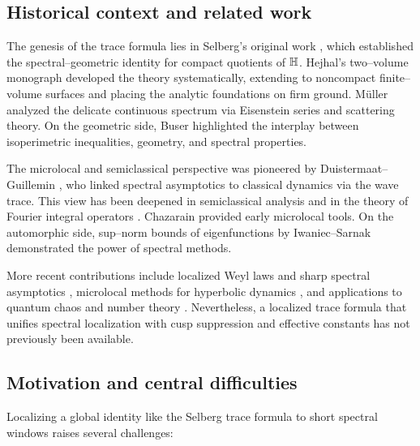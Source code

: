 \subsection{Historical context and related work}\label{subsec:history}

The genesis of the trace formula lies in Selberg’s original work
\cite{selberg1956}, which established the spectral–geometric identity for compact
quotients of $\mathbb{H}$. Hejhal’s two–volume monograph \cite{hejhal1976,hejhal1983} developed
the theory systematically, extending to noncompact finite–volume surfaces and placing the
analytic foundations on firm ground. M\"uller \cite{mueller1983} analyzed the delicate
continuous spectrum via Eisenstein series and scattering theory. On the geometric side,
Buser \cite{buser1992} highlighted the interplay between isoperimetric inequalities,
geometry, and spectral properties.

The microlocal and semiclassical perspective was pioneered by Duistermaat–Guillemin
\cite{duistermaatguillemin1975}, who linked spectral asymptotics to classical dynamics via
the wave trace. This view has been deepened in semiclassical analysis
\cite{zworski2012,dyatlov2019} and in the theory of Fourier integral operators
\cite{hormander1994III}. Chazarain \cite{chazarain1974} provided early microlocal tools.
On the automorphic side, sup–norm bounds of eigenfunctions by Iwaniec–Sarnak
\cite{iwaniec1995} demonstrated the power of spectral methods. 

More recent contributions include localized Weyl laws and sharp spectral asymptotics
\cite{canzani2019}, microlocal methods for hyperbolic dynamics \cite{dyatlov2018}, and
applications to quantum chaos and number theory \cite{sarnak2019}. Nevertheless, a
localized trace formula that unifies spectral localization with cusp suppression and
effective constants has not previously been available.

\subsection{Motivation and central difficulties}\label{subsec:difficulties}

Localizing a global identity like the Selberg trace formula to short spectral windows
raises several challenges:

